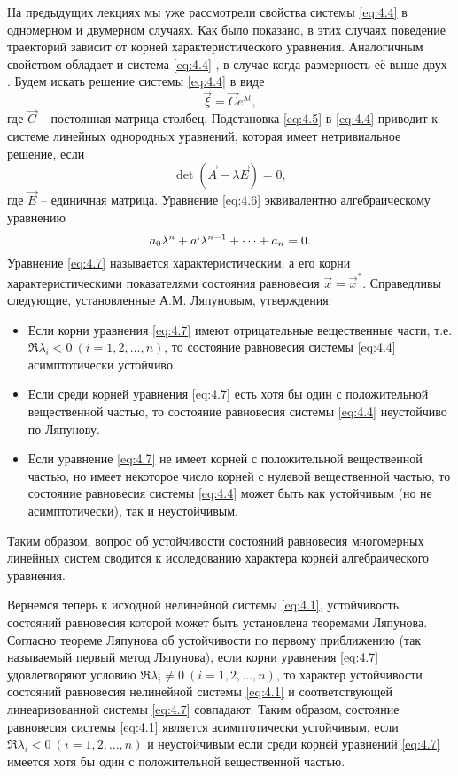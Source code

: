 На предыдущих лекциях мы уже рассмотрели свойства системы \eqref{eq:4.4}  в одномерном и двумерном случаях. Как было показано, в этих случаях поведение траекторий зависит от корней характеристического уравнения. Аналогичным свойством обладает и система \eqref{eq:4.4} , в случае когда размерность её выше двух . Будем искать решение системы \eqref{eq:4.4} в виде
\begin{equation}
        \label{eq:4.5}
\vec \xi = \vec C e^{\lambda t},
\end{equation}
где $\vec C$ -- постоянная матрица столбец. Подстановка \eqref{eq:4.5} в \eqref{eq:4.4} приводит к системе линейных однородных уравнений, которая имеет нетривиальное решение, если 
\begin{equation}
        \label{eq:4.6}
        \det(\vec A - \lambda \vec E) =0,
\end{equation}
где $\vec  E$ -- единичная матрица. Уравнение \eqref{eq:4.6} эквивалентно алгебраическому уравнению
\begin{equation}
        \label{eq:4.7}
        a_0 \lambda^n + a` \lambda^{n-1} + \dots + a_n =0.
\end{equation}
Уравнение \eqref{eq:4.7} называется характеристическим, а его корни характеристическими показателями состояния равновесия $\vec x =\vec x^*$. 
Справедливы следующие, установленные А.М. Ляпуновым, утверждения:
\begin{itemize}
        \item Если корни уравнения \eqref{eq:4.7} имеют отрицательные вещественные части, т.е. $\Re \lambda_i < 0 ~ (i= 1,2,\dots,n)$, то состояние равновесия системы \eqref{eq:4.4} асимптотически устойчиво.
 \item Если среди корней уравнения \eqref{eq:4.7} есть хотя бы один с положительной вещественной частью, то состояние равновесия системы \eqref{eq:4.4} неустойчиво по Ляпунову.
 \item  Если уравнение \eqref{eq:4.7} не имеет корней с положительной вещественной частью, но имеет некоторое число корней с нулевой вещественной частью, то состояние равновесия системы \eqref{eq:4.4} может быть как устойчивым (но не асимптотически), так и неустойчивым.
\end{itemize}
Таким образом, вопрос об устойчивости состояний равновесия многомерных линейных систем сводится к исследованию характера корней алгебраического уравнения.

Вернемся теперь к исходной нелинейной системы \eqref{eq:4.1},
устойчивость состояний равновесия которой может быть установлена теоремами Ляпунова. Согласно теореме Ляпунова об устойчивости по первому приближению (так называемый первый метод Ляпунова), если корни уравнения \eqref{eq:4.7} удовлетворяют условию $\Re \lambda_i \neq 0~ (i=1,2,\dots,n)$, то характер устойчивости состояний равновесия нелинейной системы \eqref{eq:4.1} и соответствующей линеаризованной системы \eqref{eq:4.7} совпадают. Таким образом, состояние равновесия системы \eqref{eq:4.1} является асимптотически устойчивым, если $\Re \lambda_i<0~ (i=1,2,\dots,n) $ и неустойчивым если среди корней уравнений \eqref{eq:4.7} имеется хотя бы один с положительной вещественной частью.

